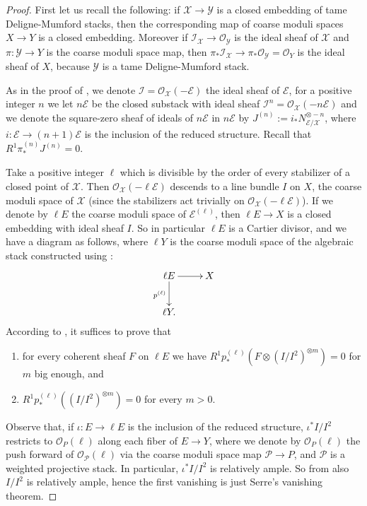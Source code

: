 \documentclass{amsart}
\newcommand{\cE}{\mathcal{E}}
\newcommand{\cI}{\mathcal{I}}
\newcommand{\cO}{\mathcal{O}}
\newcommand{\cP}{\mathcal{P}}
\newcommand{\cX}{\mathcal{X}}
\newcommand{\cY}{\mathcal{Y}}
\theoremstyle{definition}
\begin{document}
    \begin{proof}
    First let us recall the following: if $\cX\to\cY$ is a closed embedding of tame Deligne-Mumford stacks, then the corresponding map of coarse moduli spaces $X\to Y$ is a closed embedding. Moreover if $\cI_\cX\to \cO_\cY$ is the ideal sheaf of $\cX$ and $\pi:\cY\to Y$ is the coarse moduli space map, then $\pi_*\cI_\cX\to \pi_*\cO_\cY = \cO_Y$ is the ideal sheaf of $X$, because $\cY$ is a tame Deligne-Mumford stack.

    As in the proof of , we denote $\cI=\cO_{\cX}(-\cE)$ the ideal sheaf of $\cE$, for a positive integer $n$ we let $n\cE$ be the closed substack with ideal sheaf $\cI^n=\cO_{\cX}(-n\cE)$ and we denote the square-zero sheaf of ideals of $n\cE$ in $n\cE$ by $J^{(n)}:=i_*N_{\cE/\cX}^{\otimes -n}$, where $i:\cE\to (n+1)\cE$ is the inclusion of the reduced structure. Recall that $R^1\pi^{(n)}_*J^{(n)}=0$.   
    
     Take a positive integer $\ell$ which is divisible by the order of every stabilizer of a closed point of $\cX$. Then $\cO_\cX(-\ell\cE)$ descends to a line bundle $I$ on $X$, the coarse moduli space of $\cX$ (since the stabilizers act trivially on $\cO_\cX(-\ell\cE)$). If we denote by $\ell E$ the coarse moduli space of $\cE^{(\ell)}$, then $\ell E\to X$ is a closed embedding with ideal sheaf $I$. So in particular $\ell E$ is a Cartier divisor, and we have a diagram as follows, where $\ell Y$ is the coarse moduli space of the algebraic stack constructed using :
     $$\xymatrix{\ell E\ar[r] \ar[d]_{p^{(\ell )}} & X \\ \ell Y. &}$$
     According to \cite[Cor. 6.10]{artin1970algebraization}, it suffices to prove that
     \begin{enumerate}
         \item for every coherent sheaf $F$ on $\ell E$ we have $R^1p^{(\ell )}_*(F\otimes(I/I^2)^{\otimes m}) = 0$ for $m$ big enough, and
         \item $R^1p^{(\ell )}_*((I/I^2)^{\otimes m}) = 0$ for every $m>0$.
     \end{enumerate}

     Observe that, if $\iota:E\to \ell E$ is the inclusion of the reduced structure, $\iota^*I/I^2$ restricts to $\cO_P(\ell )$ along each fiber of $E\to Y$, where we denote by $\cO_P(\ell )$ the push forward of $\cO_{\cP}(\ell )$ via the coarse moduli space map $\cP\to P$, and $\cP$ is a weighted projective stack. In particular, $\iota^*I/I^2$ is relatively ample. So from \cite[\href{https://stacks.math.columbia.edu/tag/0B5V}{Tag 0B5V}]{stacks-project} also $I/I^2$ is relatively ample, hence the first vanishing is just Serre's vanishing theorem.


\end{proof}
\end{document}
